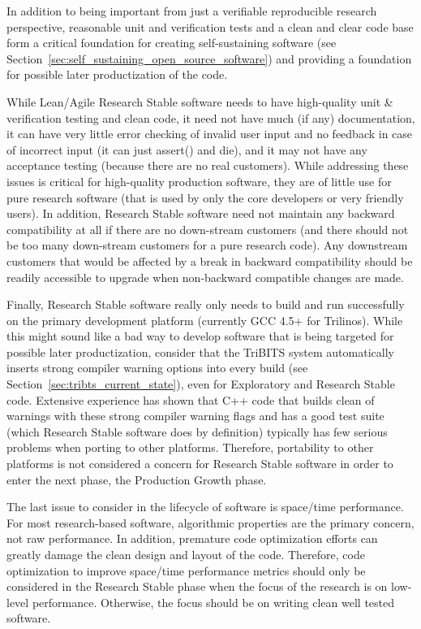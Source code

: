 \documentclass[11pt]{SANDreport}
\begin{document}
In addition to being important from just a verifiable reproducible
research perspective, reasonable unit and verification tests and a
clean and clear code base form a critical foundation for creating
self-sustaining software (see
Section~\ref{sec:self_sustaining_open_source_software}) and providing
a foundation for possible later productization of the code.

While Lean/Agile Research Stable software needs to have high-quality
unit \& verification testing and clean code, it need not have much (if
any) documentation, it can have very little error checking of invalid
user input and no feedback in case of incorrect input (it can just
assert() and die), and it may not have any acceptance testing (because
there are no real customers).  While addressing these issues is
critical for high-quality production software, they are of little use
for pure research software (that is used by only the core developers
or very friendly users).  In addition, Research Stable software need
not maintain any backward compatibility at all if there are no
down-stream customers (and there should not be too many down-stream
customers for a pure research code).  Any downstream customers that
would be affected by a break in backward compatibility should be
readily accessible to upgrade when non-backward compatible changes are
made.

Finally, Research Stable software really only needs to build and run
successfully on the primary development platform (currently GCC 4.5+
for Trilinos).  While this might sound like a bad way to develop
software that is being targeted for possible later productization,
consider that the TriBITS system automatically inserts strong compiler
warning options into every build (see
Section~\ref{sec:tribts_current_state}), even for Exploratory and
Research Stable code.  Extensive experience has shown that C++ code
that builds clean of warnings with these strong compiler warning flags
and has a good test suite (which Research Stable software does by
definition) typically has few serious problems when porting to other
platforms.  Therefore, portability to other platforms is not
considered a concern for Research Stable software in order to enter
the next phase, the Production Growth phase.

The last issue to consider in the lifecycle of software is space/time
performance.  For most research-based software, algorithmic properties
are the primary concern, not raw performance.  In addition, premature
code optimization efforts can greatly damage the clean design and
layout of the code.  Therefore, code optimization to improve
space/time performance metrics should only be considered in the
Research Stable phase when the focus of the research is on low-level
performance.  Otherwise, the focus should be on writing clean well
tested software.
\end{document}
